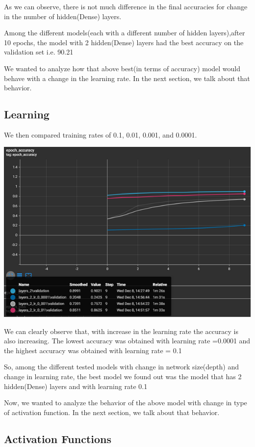 \documentclass[12pt]{article}
\begin{document}
As we can observe, there is not much difference in the final accuracies for change in the number of hidden(Dense) layers.

Among the different models(each with a different number of hidden layers),after 10 epochs, the model with 2 hidden(Dense) layers had the best accuracy on the validation set i.e. 90.21%

We wanted to analyze how that above best(in terms of accuracy) model would behave with a change in the learning rate. In the next section, we talk about that behavior.

\subsection{Learning}
We then compared training rates of 0.1, 0.01, 0.001, and 0.0001.

\includegraphics[scale=.75]{cnngraph2.PNG}

We can clearly observe that, with increase in the learning rate the accuracy is also increasing. The lowest accuracy was obtained with learning rate =0.0001 and the highest accuracy was obtained with learning rate = 0.1

So, among the different tested models with change in network size(depth) and change in learning rate, the best model we found out was the model that has 2 hidden(Dense) layers and with learning rate 0.1

Now, we wanted to analyze the behavior of the above model with change in type of activation function. In the next section, we talk about that behavior.

\subsection{Activation Functions}
\end{document}
